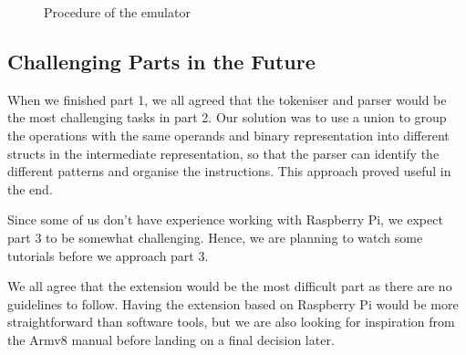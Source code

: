 \documentclass[a4paper, 9pt]{article}
\begin{document}
\begin{figure}[h]
  \centering
  \caption{Procedure of the emulator}
\end{figure}

\subsection{Challenging Parts in the Future}

When we finished part 1, we all agreed that the tokeniser and parser would be the most challenging tasks in part 2. 
Our solution was to use a union to group the operations with the same operands and binary representation into different structs in the intermediate representation,
so that the parser can identify the different patterns and organise the instructions.
This approach proved useful in the end.

Since some of us don't have experience working with Raspberry Pi, we expect part 3 to be somewhat challenging.
Hence, we are planning to watch some tutorials before we approach part 3.

We all agree that the extension would be the most difficult part as there are no guidelines to follow.
Having the extension based on Raspberry Pi would be more straightforward than software tools,
but we are also looking for inspiration from the Armv8 manual before landing on a final decision later.
\end{document}
